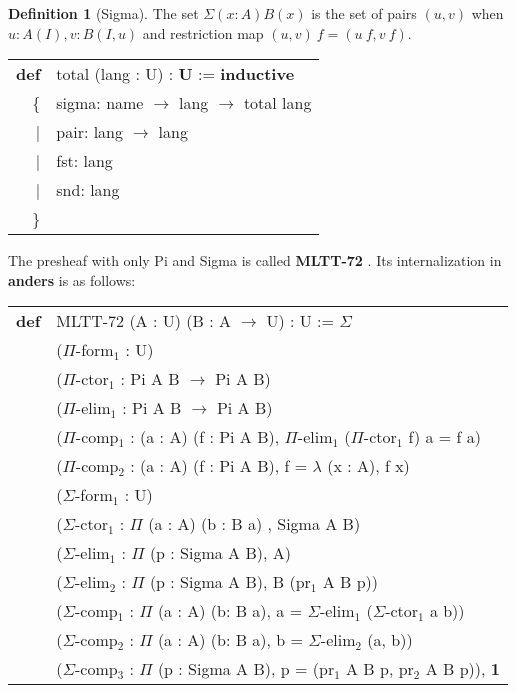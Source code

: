 \documentclass{article}
\theoremstyle{definition}
\newtheorem{definition}{Definition}
\newcommand{\tabstyle}[0]{\scriptsize\ttfamily\fontseries{l}\selectfont}
\begin{document}
\begin{definition}[Sigma]
The set $\Sigma(x:A)B(x)$ is the set of pairs $(u,v)$ when $u:A(I),v:B(I,u)$ and restriction map $(u,v)\ f=(u\ f,v\ f)$.
\end{definition}
\begin{table}[ht]
\tabstyle
\begin{tabular}{rl}
  \textbf{def} & total (lang : U) : \textbf{U} := \textbf{inductive} \\
            \{ & sigma: name $\rightarrow$ lang $\rightarrow$ total lang \\
             | & pair: lang $\rightarrow$ lang \\
             | & fst: lang \\
             | & snd: lang \\
            \} & \\
\end{tabular}
\end{table}

The presheaf with only Pi and Sigma is called \textbf{MLTT-72} \cite{MLTT72}. Its internalization in \textbf{anders} is as follows:

\begin{table}[ht!]
\tabstyle
\begin{tabular}{rl}
\textbf{def} & MLTT-72 (A : U) (B : A $\rightarrow$ U) : U := $\Sigma$ \\
             & ($\Pi$-form$_1$ : U) \\
             & ($\Pi$-ctor$_1$ : Pi A B $\rightarrow$ Pi A B) \\
             & ($\Pi$-elim$_1$ : Pi A B $\rightarrow$ Pi A B) \\
             & ($\Pi$-comp$_1$ : (a : A) (f : Pi A B), $\Pi$-elim$_1$ ($\Pi$-ctor$_1$ f) a = f a) \\
             & ($\Pi$-comp$_2$ : (a : A) (f : Pi A B), f = $\lambda$ (x : A), f x) \\
             & ($\Sigma$-form$_1$ : U) \\
             & ($\Sigma$-ctor$_1$ : $\Pi$ (a : A) (b : B a) , Sigma A B) \\
             & ($\Sigma$-elim$_1$ : $\Pi$ (p : Sigma A B), A) \\
             & ($\Sigma$-elim$_2$ : $\Pi$ (p : Sigma A B), B (pr$_1$ A B p)) \\
             & ($\Sigma$-comp$_1$ : $\Pi$ (a : A) (b: B a), a = $\Sigma$-elim$_1$ ($\Sigma$-ctor$_1$ a b)) \\
             & ($\Sigma$-comp$_2$ : $\Pi$ (a : A) (b: B a), b = $\Sigma$-elim$_2$ (a, b)) \\
             & ($\Sigma$-comp$_3$ : $\Pi$ (p : Sigma A B), p = (pr$_1$ A B p, pr$_2$ A B p)), \textbf{1}
\end{tabular}
\end{table}
\end{document}
